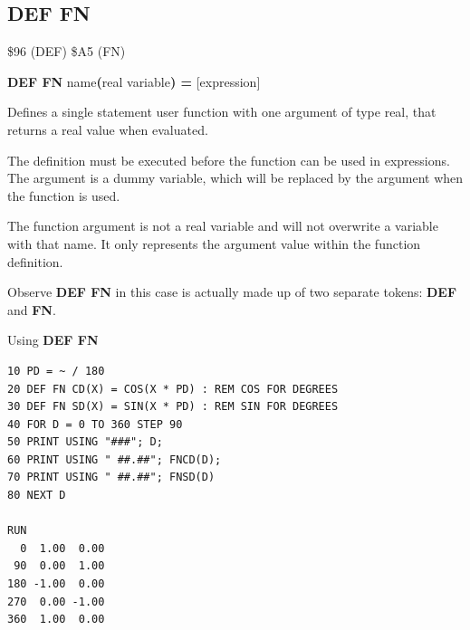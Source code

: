 \subsection{DEF FN}
\begin{description}[leftmargin=2cm,style=nextline]
\item [Token:]   \$96 (DEF) \$A5 (FN)

\item [Format:]  {\bf DEF FN} name{\bf(}real variable{\bf) =} [expression]

\item [Usage:]   Defines a single statement user function with one argument of type real, that returns a real value when evaluated.

                 The definition must be executed before the function can be used in expressions. The argument is a dummy variable, which will be replaced by the argument when the function is used.

\item [Remarks:] The function argument is not a real variable and will not overwrite a variable with that name. It only represents the argument value within the function definition.

                 Observe {\bf DEF FN} in this case is actually made up of two separate tokens: {\bf DEF} and {\bf FN}.

\item [Example:] Using {\bf DEF FN}

\begin{tcolorbox}[colback=black,coltext=white]
\verbatimfont{\codefont}
\begin{verbatim}
10 PD = ~ / 180
20 DEF FN CD(X) = COS(X * PD) : REM COS FOR DEGREES
30 DEF FN SD(X) = SIN(X * PD) : REM SIN FOR DEGREES
40 FOR D = 0 TO 360 STEP 90
50 PRINT USING "###"; D;
60 PRINT USING " ##.##"; FNCD(D);
70 PRINT USING " ##.##"; FNSD(D)
80 NEXT D

RUN
  0  1.00  0.00
 90  0.00  1.00
180 -1.00  0.00
270  0.00 -1.00
360  1.00  0.00
\end{verbatim}
\end{tcolorbox}
\end{description}


\newpage
